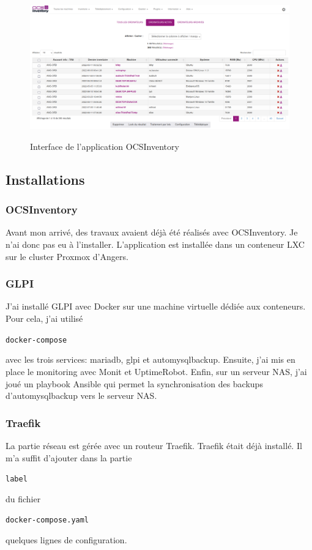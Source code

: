 \documentclass[12pt, a4paper, twoside]{article}
\begin{document}
\begin{figure}[!ht]
    \centering
    \includegraphics[width=\textwidth]{src/interface_ocsinventory.png}
    \label{fig:interface_ocsinventory}
    \caption{Interface de l'application \gls{OCSInventory}}
\end{figure}


\newpage
\subsection{Installations}
\subsubsection{OCSInventory}
Avant mon arrivé, des travaux avaient déjà été réalisés avec \gls{OCSInventory}.
Je n'ai donc pas eu à l'installer.
L'application est installée dans un conteneur LXC sur le \gls{cluster} \gls{Proxmox} d'Angers.

\subsubsection{GLPI}
J'ai installé \gls{GLPI} avec Docker sur une machine virtuelle dédiée aux conteneurs.
Pour cela, j'ai utilisé \begin{code}\texttt{docker-compose}\end{code} avec les trois services: mariadb, glpi et automysqlbackup.
Ensuite, j'ai mis en place le monitoring avec \gls{Monit} et \gls{UptimeRobot}.
Enfin, sur un serveur \gls{NAS}, j'ai joué un playbook Ansible qui permet la synchronisation des backups d'automysqlbackup vers le serveur \gls{NAS}.

\subsubsection{Traefik}
La partie réseau est gérée avec un routeur \gls{Traefik}.
\gls{Traefik} était déjà installé.
Il m'a suffit d'ajouter dans la partie \begin{code}\texttt{label}\end{code} du fichier \begin{code}\texttt{docker-compose.yaml}\end{code} quelques lignes de configuration.
\end{document}
